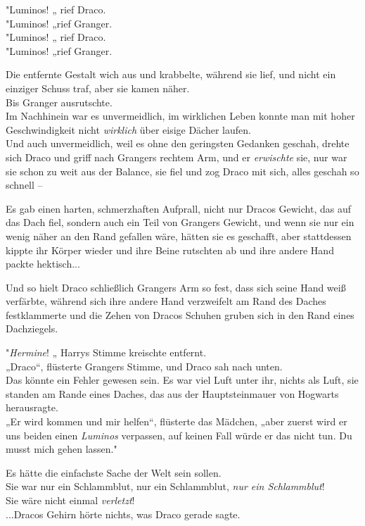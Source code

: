 {"Luminos! „ rief Draco.\\ "Luminos! „rief Granger.\\ "Luminos! „ rief Draco.\\ "Luminos! „rief Granger.

Die entfernte Gestalt wich aus und krabbelte, während sie lief, und nicht ein einziger Schuss traf, aber sie kamen näher.\\ Bis Granger ausrutschte.\\ Im Nachhinein war es unvermeidlich, im wirklichen Leben konnte man mit hoher Geschwindigkeit nicht \emph{wirklich} über eisige Dächer laufen.\\ Und auch unvermeidlich, weil es ohne den geringsten Gedanken geschah, drehte sich Draco und griff nach Grangers rechtem Arm, und er \emph{erwischte} sie, nur war sie schon zu weit aus der Balance, sie fiel und zog Draco mit sich, alles geschah so schnell --

Es gab einen harten, schmerzhaften Aufprall, nicht nur Dracos Gewicht, das auf das Dach fiel, sondern auch ein Teil von Grangers Gewicht, und wenn sie nur ein wenig näher an den Rand gefallen wäre, hätten sie es geschafft, aber stattdessen kippte ihr Körper wieder und ihre Beine rutschten ab und ihre andere Hand packte hektisch...

Und so hielt Draco schließlich Grangers Arm so fest, dass sich seine Hand weiß verfärbte, während sich ihre andere Hand verzweifelt am Rand des Daches festklammerte und die Zehen von Dracos Schuhen gruben sich in den Rand eines Dachziegels.

"\emph{Hermine}! „ Harrys Stimme kreischte entfernt.\\ „Draco“, flüsterte Grangers Stimme, und Draco sah nach unten.\\ Das könnte ein Fehler gewesen sein. Es war viel Luft unter ihr, nichts als Luft, sie standen am Rande eines Daches, das aus der Hauptsteinmauer von Hogwarts herausragte.\\ „Er wird kommen und mir helfen“, flüsterte das Mädchen, „aber zuerst wird er uns beiden einen \emph{Luminos} verpassen, auf keinen Fall würde er das nicht tun. Du musst mich gehen lassen."

Es hätte die einfachste Sache der Welt sein sollen.\\ Sie war nur ein Schlammblut, nur ein Schlammblut, \emph{nur ein Schlammblut}!\\ Sie wäre nicht einmal \emph{verletzt}!\\ ...Dracos Gehirn hörte nichts, was Draco gerade sagte.

}
